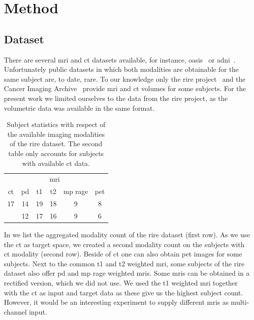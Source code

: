 \section{Method}

\subsection{Dataset}

There are several \gls{mri} and \gls{ct} datasets available, for
instance, \gls{oasis}~\cite{OASIS} or \gls{adni}~\cite{ADNI}. Unfortunately
public datasets in which both modalities are obtainable for the same subject
are, to date, rare. To our knowledge only the \gls{rire} project~\cite{RIRE}
and the Cancer Imaging Archive~\cite{CIA} provide \gls{mri} and \gls{ct}
volumes for some subjects. For the present work we limited ourselves to the
data from the \gls{rire} project, as the volumetric data was available in the
same format.
\begin{table}[h]
  \centering
  \begin{tabular}{*{6}{c}}
    \toprule
    & \multicolumn{4}{c}{\acrshort{mri}}
		& \\
   	\cmidrule{2-5}
    \acrshort{ct} &
		\acrshort{pd} &
		\acrshort{t1} &
		\acrshort{t2} &
		\acrshort{mp} \acrshort{rage} &
		\acrshort{pet} \\
    \midrule
    \num{17} & \num{14} & \num{19} & \num{18} & \num{9} & \num{8} \\
             & \num{12} & \num{17} & \num{16} & \num{9} & \num{6} \\
    \bottomrule
  \end{tabular}
  \caption{Subject statistics with respect of the available imaging
    modalities of the \gls{rire} dataset. The second table only accounts for
    subjects with available \gls{ct} data.
  }\label{tab:rire}
\end{table}
In  we list the aggregated modality count of the \gls{rire}
dataset (first row). As we use the \gls{ct} as target space, we created a
second modality count on the subjects with \gls{ct} modality (second row).
Beside of \gls{ct} one can also obtain \gls{pet} images for some subjects.
Next to the common \gls{t1} and \gls{t2} weighted \gls{mri}, some subjects of
the \gls{rire} dataset also offer \gls{pd} and \gls{mp} \gls{rage} weighted
\gls{mri}s. Some \gls{mri}s can be obtained in a rectified version, which we
did not use. We used the \gls{t1} weighted \gls{mri} together with the
\gls{ct} as input and target data as these give us the highest subject count.
However, it would be an interesting experiment to supply different \gls{mri}s
as multi-channel input.

